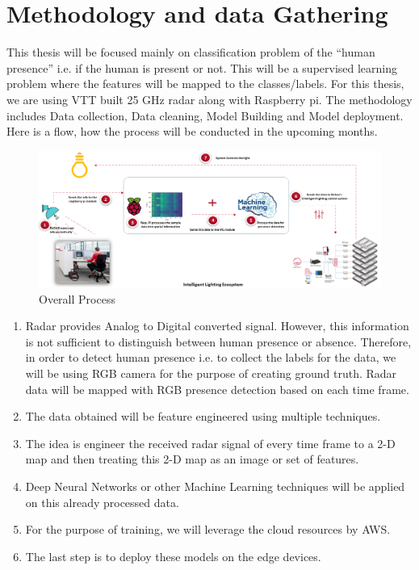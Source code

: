 \chapter{Methodology and data Gathering}
\label{chapter:methodology}
This thesis will be focused mainly on classification problem of the “human presence” i.e. if the human is present or not. This will be a supervised learning problem where the features will be mapped to the classes/labels.
For this thesis, we are using VTT built 25 GHz radar along with Raspberry pi. The methodology includes Data collection, Data cleaning, Model Building and Model deployment. Here is a flow, how the process will be conducted in the upcoming months.

\begin{figure}[ht]
  \begin{center}
    \includegraphics[width=1\textwidth]{Master's thesis/images/thesis_presentation.png} 
    \caption{Overall Process}
    \label{fig:basic_principle}
  \end{center}
\end{figure}


\begin{enumerate}
    \item Radar provides Analog to Digital converted signal. However, this information is not sufficient to distinguish between human presence or absence. Therefore, in order to detect human presence i.e. to collect the labels for the data, we will be using RGB camera for the purpose of creating ground truth. Radar data will be mapped with RGB presence detection based on each time frame.
    \item The data obtained will be feature engineered using multiple techniques.
    \item The idea is engineer the received radar signal of every time frame to a 2-D map and then treating this 2-D map as an image or set of features.
    \item Deep Neural Networks or other Machine Learning techniques will be applied on this already processed data.
    \item For the purpose of training, we will leverage the cloud resources by AWS.
    \item The last step is to deploy these models on the edge devices.
\end{enumerate}

